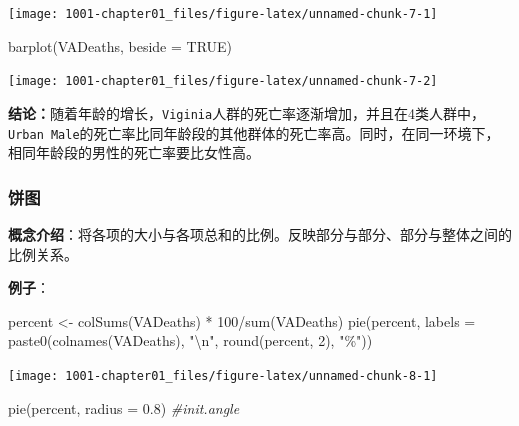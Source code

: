 \documentclass[
]{book}
\newenvironment{Shaded}{\begin{snugshade}}{\end{snugshade}}
\newcommand{\AttributeTok}[1]{\textcolor[rgb]{0.77,0.63,0.00}{#1}}
\newcommand{\CommentTok}[1]{\textcolor[rgb]{0.56,0.35,0.01}{\textit{#1}}}
\newcommand{\ConstantTok}[1]{\textcolor[rgb]{0.00,0.00,0.00}{#1}}
\newcommand{\DecValTok}[1]{\textcolor[rgb]{0.00,0.00,0.81}{#1}}
\newcommand{\FloatTok}[1]{\textcolor[rgb]{0.00,0.00,0.81}{#1}}
\newcommand{\FunctionTok}[1]{\textcolor[rgb]{0.00,0.00,0.00}{#1}}
\newcommand{\NormalTok}[1]{#1}
\newcommand{\OtherTok}[1]{\textcolor[rgb]{0.56,0.35,0.01}{#1}}
\newcommand{\SpecialCharTok}[1]{\textcolor[rgb]{0.00,0.00,0.00}{#1}}
\newcommand{\StringTok}[1]{\textcolor[rgb]{0.31,0.60,0.02}{#1}}
\begin{document}
\begin{center}\texttt{[image: 1001-chapter01\_files/figure-latex/unnamed-chunk-7-1]} \end{center}

\begin{Shaded}
\begin{Highlighting}[]
\FunctionTok{barplot}\NormalTok{(VADeaths, }\AttributeTok{beside =} \ConstantTok{TRUE}\NormalTok{)}
\end{Highlighting}
\end{Shaded}

\begin{center}\texttt{[image: 1001-chapter01\_files/figure-latex/unnamed-chunk-7-2]} \end{center}

\textbf{结论：}随着年龄的增长，\texttt{Viginia}人群的死亡率逐渐增加，并且在4类人群中， \texttt{Urban\ Male}的死亡率比同年龄段的其他群体的死亡率高。同时，在同一环境下，相同年龄段的男性的死亡率要比女性高。

\hypertarget{ux997cux56fe}{%
\subsubsection{饼图}\label{ux997cux56fe}}

\textbf{概念介绍}：将各项的大小与各项总和的比例。反映部分与部分、部分与整体之间的比例关系。

\textbf{例子}：

\begin{Shaded}
\begin{Highlighting}[]
\NormalTok{percent }\OtherTok{\textless{}{-}} \FunctionTok{colSums}\NormalTok{(VADeaths) }\SpecialCharTok{*} \DecValTok{100}\SpecialCharTok{/}\FunctionTok{sum}\NormalTok{(VADeaths)}
\FunctionTok{pie}\NormalTok{(percent, }\AttributeTok{labels =} \FunctionTok{paste0}\NormalTok{(}\FunctionTok{colnames}\NormalTok{(VADeaths), }\StringTok{"}\SpecialCharTok{\textbackslash{}n}\StringTok{"}\NormalTok{, }\FunctionTok{round}\NormalTok{(percent, }\DecValTok{2}\NormalTok{), }\StringTok{"\%"}\NormalTok{))}
\end{Highlighting}
\end{Shaded}

\begin{center}\texttt{[image: 1001-chapter01\_files/figure-latex/unnamed-chunk-8-1]} \end{center}

\begin{Shaded}
\begin{Highlighting}[]
\FunctionTok{pie}\NormalTok{(percent, }\AttributeTok{radius =} \FloatTok{0.8}\NormalTok{)  }\CommentTok{\#init.angle}
\end{Highlighting}
\end{Shaded}
\end{document}
